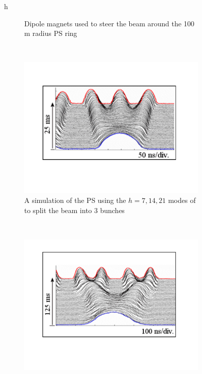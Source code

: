 \begin{figure}{h}
\begin{subfigure}[h]{0.45\textwidth}
        \caption{Dipole magnets used to steer the beam around the 100
          m radius PS ring \cite{LHC:LHC_ps_dipoles_image}}\label{fig:ps_dipoles}
      \end{subfigure}
      ~ %
      \begin{subfigure}[h]{0.45\textwidth}
        \includegraphics[width=\textwidth]{Figures/LHC_Diagrams/LHC__PS__TripleBunchSplitting.pdf}
        \caption{A simulation of the PS using the $h=7,14,21$ modes of
        to split the beam into 3 bunches \cite{LHC:TDR_Vol3_InjectionChain_Benedikt}}\label{fig:ps_split3}
      \end{subfigure}
       ~ %
      \begin{subfigure}[h]{0.45\textwidth}
        \includegraphics[width=\textwidth]{Figures/LHC_Diagrams/LHC__PS__DoubleDoubleBunchSplitting.pdf}

\end{subfigure}
\end{figure}
